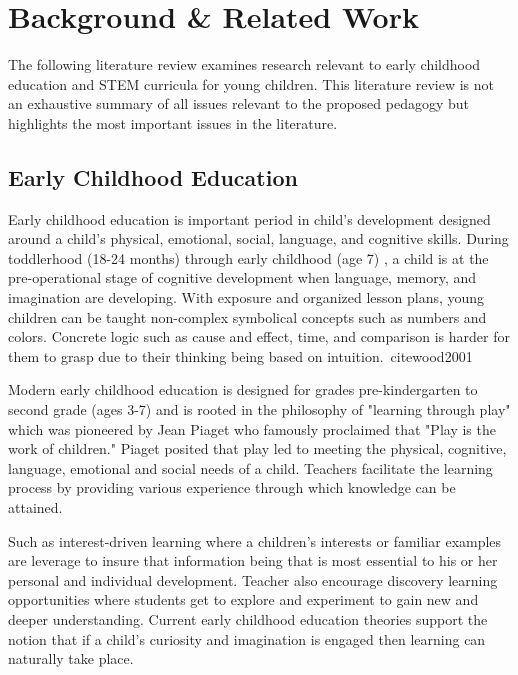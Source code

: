 \documentclass[11pt, letterpaper, onecolumn]{article}
\begin{document}

\section{Background \& Related Work}
%
The following literature review examines research relevant to early childhood education and STEM curricula for young children.
%
This literature review is not an exhaustive summary of all issues  relevant to the proposed pedagogy but highlights the most important  issues in the literature. 
%

\subsection{Early Childhood Education}
%
Early childhood education is important period in child's development designed around a child's physical, emotional, social, language, and cognitive skills.
%
During toddlerhood (18-24 months) through early childhood (age 7) , a child is at the pre-operational stage of cognitive development when language, memory, and imagination are developing.
%
With exposure and organized lesson plans, young children can be taught non-complex symbolical concepts such as numbers and colors. 
%
Concrete logic such as cause and effect, time, and comparison is harder for them to grasp due to their thinking being based on intuition.~cite{wood2001}
%

%
Modern early childhood education is designed for grades pre-kindergarten to second grade (ages 3-7)  and is rooted in the philosophy of  "learning through play" which was pioneered by Jean Piaget who famously proclaimed that "Play is the work of children."%
%
Piaget posited that play led to meeting the physical, cognitive, language, emotional and social needs  of a child.
%
Teachers facilitate the learning process by providing various experience through which knowledge can be attained.

Such as interest-driven learning where a children's interests or familiar examples are leverage to insure that information being that is most essential to his or her personal and individual development.
%
Teacher also encourage discovery learning opportunities where students get to explore and experiment to gain new and deeper understanding.
%
Current early childhood education theories support the notion that if a child's curiosity and imagination is engaged then learning can naturally take place.
\end{document}
